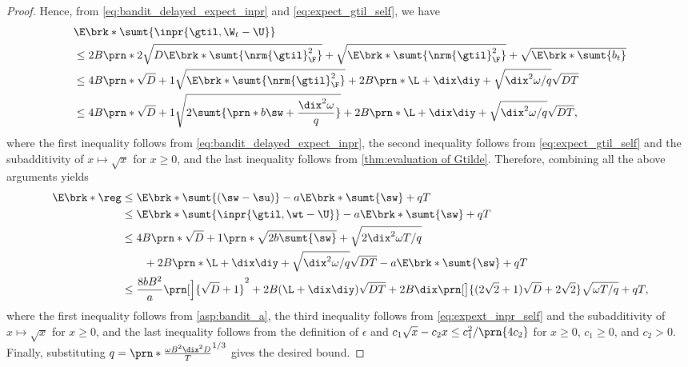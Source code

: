 \begin{proof}
Hence, from \eqref{eq:bandit_delayed_expect_inpr} and \eqref{eq:expect_gtil_self}, we have
\begin{align}\label{eq:expext_inpr_self}
    &\E\brk*{\sumt{\inpr{\gtil,\W_t-\U}}}\nonumber\\
    &\leq 2B\prn*{2\sqrt{D\E\brk*{\sumt{\nrm{\gtil}_\F^2}}}+\sqrt{\E\brk*{\sumt{\nrm{\gtil}_\F^2}}}+\sqrt{\E\brk*{\sumt{b_t}}}}\nonumber\\
    &\leq 4B\prn*{\sqrt{D}+1}\sqrt{\E\brk*{\sumt{\nrm{\gtil}_\F^2}}} + 2B\prn*{\L+ \dix \diy + \sqrt{ \dix^2\omega / q } } \sqrt{DT}\nonumber\\
    &\leq 4B\prn*{\sqrt{D}+1}\sqrt{2\sumt{\prn*{b\sw+\frac{\dix^2\omega}{q}}}
    }
    + 2B\prn*{\L+ \dix \diy + \sqrt{\dix^2\omega / q} } \sqrt{DT},
\end{align}
where the first inequality follows from \eqref{eq:bandit_delayed_expect_inpr}, 
the second inequality follows from \eqref{eq:expect_gtil_self} and the subadditivity of $x \mapsto \sqrt{x}$ for $x \geq 0$, 
and the last inequality follows from \cref{thm:evaluation of Gtilde}.
Therefore, combining all the above arguments yields 
\begin{align*}
    \E\brk*{\reg}
    &\leq \E\brk*{\sumt{(\sw-\su)}} - a\E\brk*{\sumt{\sw}} + q T\\
    &\leq \E\brk*{\sumt{\inpr{\gtil,\wt-\U}}} - a\E\brk*{\sumt{\sw}} + q T\\
    & \leq 4B\prn*{\sqrt{D} + 1}\prn*{\sqrt{2b\sumt{\sw}}+\sqrt{ 2\dix^2\omega T / q}
    }
    \nonumber \\
    &\qquad+ 2B\prn*{\L+ \dix \diy + \sqrt{\dix^2\omega / q}  } \sqrt{DT} - a\E\brk*{\sumt{\sw}} + q T \\
    &\leq
    \frac{8bB^2}{a}\prn[\Big]{\sqrt{D} + 1}^2
    +2B (\L+\dix \diy )\sqrt{DT}
    +2B\dix\prn[\big]{(2\sqrt{2}+1)\sqrt{D}+2\sqrt{2}}\sqrt{\omega T/ q} + q T,
\end{align*}
where the first inequality follows from \cref{asp:bandit_a}, 
the third inequality follows from \eqref{eq:expext_inpr_self} and the subadditivity of $x \mapsto \sqrt{x}$ for $x \geq 0$, 
and the last inequality follows from the definition of $\epsilon$ and $c_1\sqrt{x}-c_2x\leq{c_1^2}/\prn{4c_2}$ for $x \geq 0$, $c_1 \geq 0$, and $c_2 > 0$.
Finally, substituting $q=\prn*{\frac{\omega B^2\dix^2 D}{T}}^{1/3}$ gives the desired bound.
\end{proof}

